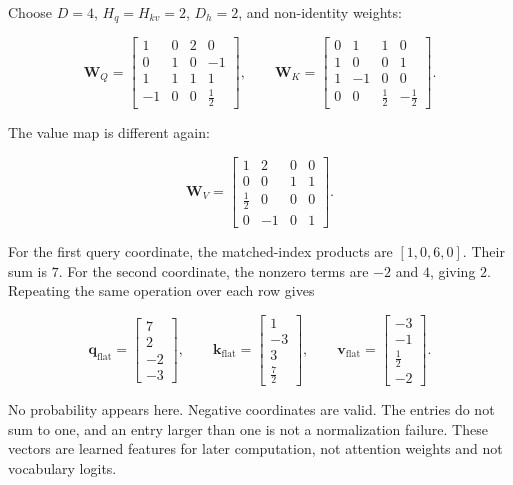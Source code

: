 \documentclass[
  10pt,
]{article}
\begin{document}
Choose \(D=4\), \(H_q=H_{kv}=2\), \(D_h=2\), and non-identity weights:

\[
\mathbf{W}_Q=
\begin{bmatrix}
1&0&2&0\\0&1&0&-1\\1&1&1&1\\-1&0&0&\tfrac12
\end{bmatrix},\qquad
\mathbf{W}_K=
\begin{bmatrix}
0&1&1&0\\1&0&0&1\\1&-1&0&0\\0&0&\tfrac12&-\tfrac12
\end{bmatrix}.
\]

The value map is different again:

\[
\mathbf{W}_V=
\begin{bmatrix}
1&2&0&0\\0&0&1&1\\\tfrac12&0&0&0\\0&-1&0&1
\end{bmatrix}.
\]

For the first query coordinate, the matched-index products are
\([1,0,6,0]\). Their sum is \(7\). For the second coordinate, the
nonzero terms are \(-2\) and \(4\), giving \(2\). Repeating the same
operation over each row gives

\[
\mathbf{q}_{\mathrm{flat}}=
\begin{bmatrix}7\\2\\-2\\-3\end{bmatrix},\qquad
\mathbf{k}_{\mathrm{flat}}=
\begin{bmatrix}1\\-3\\3\\\tfrac72\end{bmatrix},\qquad
\mathbf{v}_{\mathrm{flat}}=
\begin{bmatrix}-3\\-1\\\tfrac12\\-2\end{bmatrix}.
\]

No probability appears here. Negative coordinates are valid. The entries
do not sum to one, and an entry larger than one is not a normalization
failure. These vectors are learned features for later computation, not
attention weights and not vocabulary logits.
\end{document}
